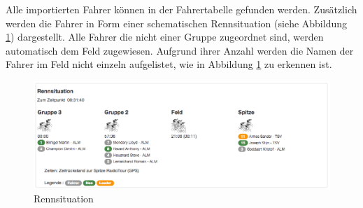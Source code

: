 Alle importierten Fahrer können in der Fahrertabelle gefunden werden. Zusätzlich werden die Fahrer in Form einer schematischen Rennsituation (siehe Abbildung \ref{fig:rennsituationneu}) dargestellt. Alle Fahrer die nicht einer Gruppe zugeordnet sind, werden automatisch dem Feld zugewiesen. Aufgrund ihrer Anzahl werden die Namen der Fahrer im Feld nicht einzeln aufgelistet, wie in Abbildung \ref{fig:rennsituationneu} zu erkennen ist.

\begin{figure}[H]
	\centering
	\includegraphics[width=130mm]{images/tourliveweb/rennsituation_neu.png}
	\caption{Rennsituation}
	\label{fig:rennsituationneu}
\end{figure}